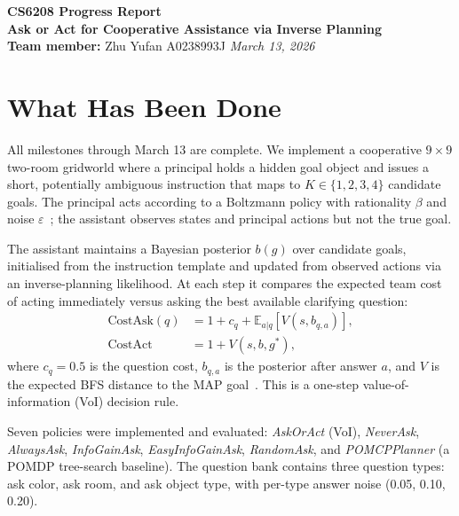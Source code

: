 \documentclass[10pt,twocolumn]{article}
\begin{document}
\begin{center}
{\Large \textbf{CS6208 Progress Report}}\\
\vspace{2pt}
{\large \textbf{Ask or Act for Cooperative Assistance via Inverse Planning}}\\
\vspace{4pt}
\textbf{Team member:} Zhu Yufan \; A0238993J \quad \textit{March 13, 2026}
\end{center}

\vspace{-4pt}

\section*{What Has Been Done}

All milestones through March 13 are complete.
We implement a cooperative $9{\times}9$ two-room gridworld where a principal holds a hidden goal object and issues a short, potentially ambiguous instruction that maps to $K \in \{1,2,3,4\}$ candidate goals.
The principal acts according to a Boltzmann policy with rationality $\beta$ and noise $\varepsilon$~\cite{baker2009,jara2016}; the assistant observes states and principal actions but not the true goal.

The assistant maintains a Bayesian posterior $b(g)$ over candidate goals, initialised from the instruction template and updated from observed actions via an inverse-planning likelihood.
At each step it compares the expected team cost of acting immediately versus asking the best available clarifying question:
\begin{align*}
  \text{CostAsk}(q) &= 1 + c_q + \mathbb{E}_{a|q}[V(s,b_{q,a})], \\
  \text{CostAct}    &= 1 + V(s,b,g^*),
\end{align*}
where $c_q{=}0.5$ is the question cost, $b_{q,a}$ is the posterior after answer $a$, and $V$ is the expected BFS distance to the MAP goal~\cite{hadfield2016cirl,tan2024clips}.
This is a one-step value-of-information (VoI) decision rule.

Seven policies were implemented and evaluated: \textit{AskOrAct} (VoI), \textit{NeverAsk}, \textit{AlwaysAsk}, \textit{InfoGainAsk}, \textit{EasyInfoGainAsk}, \textit{RandomAsk}, and \textit{POMCPPlanner} (a POMDP tree-search baseline).
The question bank contains three question types: ask color, ask room, and ask object type, with per-type answer noise (0.05, 0.10, 0.20).
\end{document}
